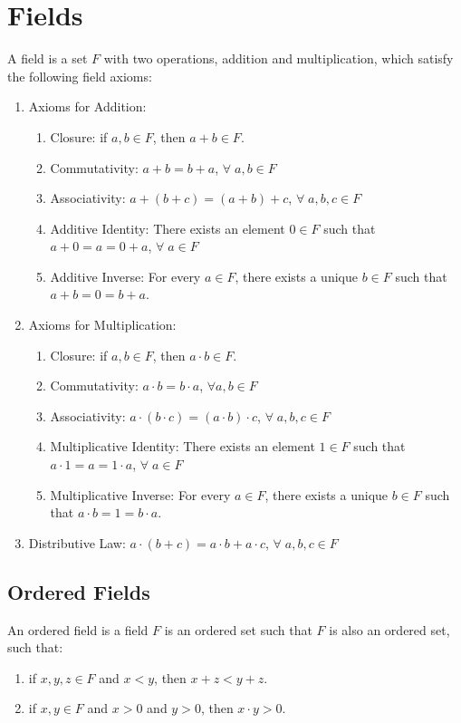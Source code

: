 \documentclass[12pt, oneside]{book}
\begin{document}
\section{Fields}
A field is a set \(F\) with two operations, addition and multiplication, which satisfy the following field axioms:
\begin{enumerate}
	\item Axioms for Addition:
	      \begin{enumerate}
		      \item Closure: if \(a,b \in F\), then \(a+b \in F\).
		      \item Commutativity: \(a+b = b+a\), \(\forall \; a,b \in F\)
		      \item Associativity: \(a+(b+c) = (a+b)+c\), \(\forall \; a,b,c \in F\)
		      \item Additive Identity: There exists an element \(0 \in F\) such that \(a+0 = a = 0+a\), \(\forall \; a \in F\)
		      \item Additive Inverse: For every \(a \in F\), there exists a unique \(b \in F\) such that \(a+b = 0 = b+a\).
	      \end{enumerate}
	\item Axioms for Multiplication:
	      \begin{enumerate}
		      \item Closure: if \(a,b \in F\), then \(a \cdot b \in F\).
		      \item Commutativity: \(a \cdot b = b \cdot a\), \(\forall a,b \in F\)
		      \item Associativity: \(a \cdot (b \cdot c) = (a \cdot b) \cdot c\), \(\forall \; a,b,c \in F\)
		      \item Multiplicative Identity: There exists an element \(1 \in F\) such that \(a \cdot 1 = a = 1 \cdot a\), \(\forall \; a \in F\)
		      \item Multiplicative Inverse: For every \(a \in F\), there exists a unique \(b \in F\) such that \(a \cdot b = 1 = b \cdot a\).
	      \end{enumerate}
	\item Distributive Law: \(a \cdot (b+c) = a \cdot b + a \cdot c\), \(\forall \; a,b,c \in F\)
\end{enumerate}

\subsection{Ordered Fields}
An ordered field is a field \(F\) is an ordered set such that \(F\) is also an ordered set, such that:
\begin{enumerate}
	\item if \(x,y,z \in F\) and \(x < y\), then \(x+z < y+z\).
	\item if \(x,y \in F\) and \(x > 0\) and \(y > 0\), then \(x \cdot y > 0\).
\end{enumerate}
\end{document}
